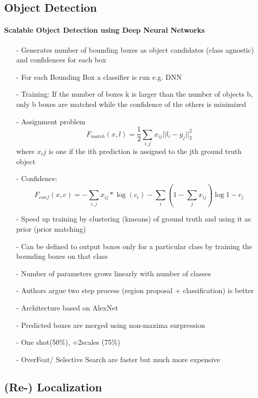 	\subsection{Object Detection}
		\paragraph{Scalable Object Detection using Deep Neural Networks\cite{Erhan}}
		\begin{itemize}
			\item[-] Generates number of bounding boxes as object candidates (class agnostic) and confidences for each box
			\item[-] For each Bounding Box a classifier is run e.g. DNN
			\item[-] Training: If the number of boxes k is larger than the number of objects b, only b boxes are matched while the confidence of the others is minimized
			\item[-] Assignment problem $$F_{match}(x,l) = \frac{1}{2}\sum_{i,j}x_{ij}||l_i - g_j||^2_2$$ where $x_ij$ is one if the ith prediction is assigned to the jth ground truth object
			\item[-] Confidence: 
			$$F_{conf}(x,c) = - \sum_{i,j}x_{ij}*\log(c_i)-\sum_{i}(1-\sum_{j}x_{ij})\log{1-c_j}$$
			\item[-] Speed up training by clustering (kmeans) of ground truth and using it as prior (prior matching)
			\item[-] Can be defined to output boxes only for a particular class by training the bounding boxes on that class
			\item[-] Number of parameters grows linearly with number of classes
			\item[-] Authors argue two step process (region proposal + classification) is better
			\item[-] Architecture based on AlexNet
			\item[-] Predicted boxes are merged using non-maxima surpression
			\item[-] One shot(50\%), +2scales (75\%)
			\item[-] OverFeat/ Selective Search are faster but much more expensive
		\end{itemize}

	\subsection{(Re-) Localization}
